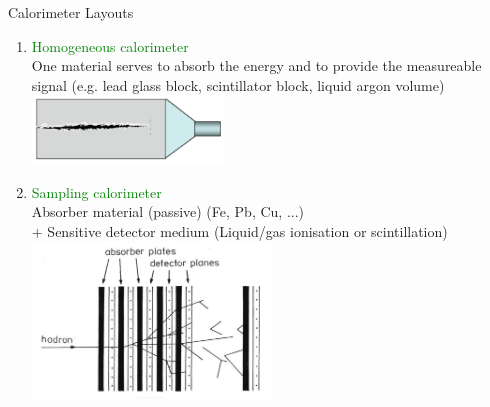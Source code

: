 \documentclass[style=husky,clock,size=9pt,dvipsnames]{powerdot}
\newcommand\mygreen{\textcolor{Green}} %
\begin{document}
\begin{slide}[trans=Fly]{Calorimeter Layouts}
	\begin{enumerate}
		\item  \mygreen{Homogeneous calorimeter}\\
		One material serves to absorb the energy and to provide the measureable signal
		(e.g. lead glass block, scintillator block, liquid argon volume)\\
		\includegraphics[width=0.4\textwidth]{Figures/homogeneous_calor}
		\item 
		\mygreen{Sampling calorimeter}\\
		Absorber material (passive) (Fe, Pb, Cu, ...)\\
		+ Sensitive detector medium (Liquid/gas ionisation or scintillation)\\
		\includegraphics[width=0.5\textwidth]{Figures/sampling_calor}
	\end{enumerate}
\end{slide}
\end{document}
